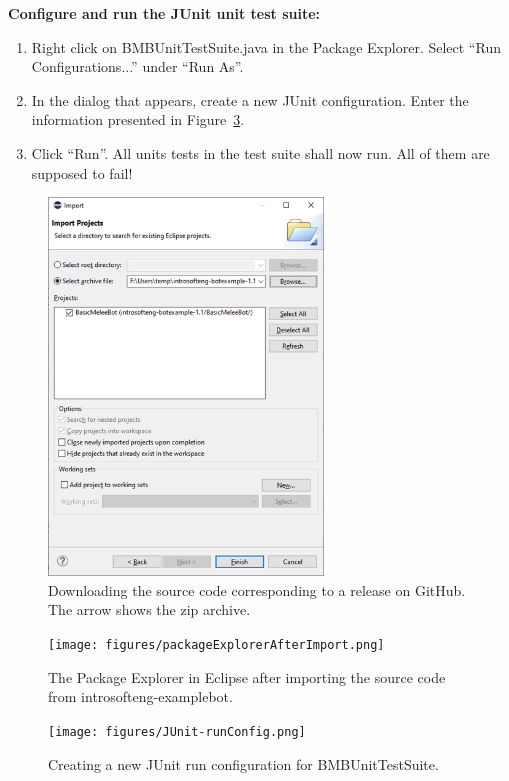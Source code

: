 \documentclass{scrreprt}
\begin{document}
\textbf{Configure and run the JUnit unit test suite:}
\begin{enumerate}
\item Right click on BMBUnitTestSuite.java in the Package Explorer. Select ``Run Configurations...'' under ``Run As''.
\item In the dialog that appears, create a new JUnit configuration. Enter the information presented in Figure~\ref{fig:runConfig}.
\item Click ``Run''. All units tests in the test suite shall now run. All of them are supposed to fail!
\end{enumerate}

\begin{figure}
\centering
\includegraphics[width=0.65\textwidth]{figures/Eclipse-import.png}
\caption{Downloading the source code corresponding to a release on GitHub. The arrow shows the zip archive.}
\label{fig:eclipse-import}
\end{figure}

\begin{figure}
\centering
\texttt{[image: figures/packageExplorerAfterImport.png]}
\caption{The Package Explorer in Eclipse after importing the source code from introsofteng-examplebot.}
\label{fig:afterImport}
\end{figure}

\begin{figure}
\centering
\texttt{[image: figures/JUnit-runConfig.png]}
\caption{Creating a new JUnit run configuration for BMBUnitTestSuite.}
\label{fig:runConfig}
\end{figure}
\end{document}
